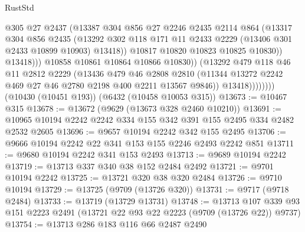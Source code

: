 \begin{lexlean}{RustStd}
\begin{coremodule}
                              @305
                              @27
                              @2437
                              (@13387
                                @304
                                @856
                                @27
                                @2246
                                @2435
                                @2114
                                @864
                                (@13317
                                  @304
                                  @856
                                  @2435
                                  (@13292
                                    @302
                                    @118
                                    @171
                                    @11
                                    @2433
                                    @2229
                                    (@13406 @301 @2433 @10899 @10903)
                                    @13418))
                                @10817
                                @10820
                                @10823
                                @10825
                                @10830))
                            @13418)))
                      @10858
                      @10861
                      @10864
                      @10866
                      @10830))
                  (@13292
                    @479
                    @118
                    @46
                    @11
                    @2812
                    @2229
                    (@13436
                      @479
                      @46
                      @2808
                      @2810
                      (@11344 @13272 @2242 @469 @27 @46 @2780 @2198 @400 @2211 @13567 @9846))
                    @13418))))))))
    (@10430 (@10451 @193))
    (@6432 (@10458 @10053 @315))
@13673 := @10467 @315
@13678 := @13672 (@9629 (@13673 @328 @2460 @10210))
@13691 := @10965 @10194 @2242 @2242 @334 @155 @342 @391 @155 @2495 @334 @2482 @2532 @2605
@13696 := @9657 @10194 @2242 @342 @155 @2495
@13706 := @9666 @10194 @2242 @22 @341 @153 @155 @2246 @2493 @2242 @851
@13711 := @9680 @10194 @2242 @341 @153 @2493
@13713 := @9689 @10194 @2242
@13719 := @13713 @337 @340 @38 @152 @2484 @2492
@13721 := @9701 @10194 @2242
@13725 := @13721 @320 @38 @320 @2484
@13726 := @9710 @10194
@13729 := @13725 (@9709 (@13726 @320))
@13731 := @9717 (@9718 @2484)
@13733 := @13719 (@13729 @13731)
@13748 := @13713
    @107
    @339
    @93
    @151
    @2223
    @2491
    (@13721 @22 @93 @22 @2223 (@9709 (@13726 @22)) @9737)
@13754 := @13713 @286 @183 @116 @66 @2487 @2490

\end{coremodule}
\end{lexlean}

